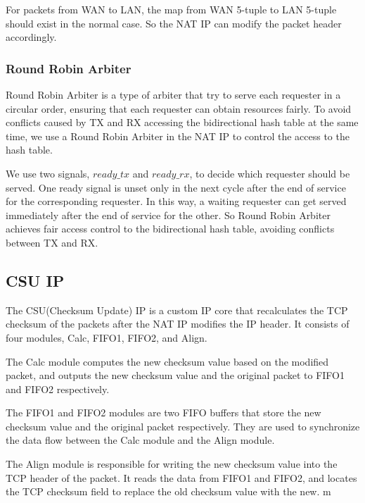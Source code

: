     For packets from WAN to LAN, the map from WAN 5-tuple to LAN 5-tuple should exist in the normal case. So the NAT IP can modify the packet header accordingly.

    \subsubsection{Round Robin Arbiter}
    Round Robin Arbiter is a type of arbiter that try to serve each requester in a circular order, ensuring that each requester can obtain resources fairly. To avoid conflicts caused by TX and RX accessing the bidirectional hash table at the same time, we use a Round Robin Arbiter in the NAT IP to control the access to the hash table. 

    We use two signals, $ready\_tx$ and $ready\_rx$, to decide which requester should be served. One ready signal  is unset only in the next cycle after the end of service for the corresponding requester. In this way, a waiting requester can get served immediately after the end of service for the other. So Round Robin Arbiter achieves fair access control to the bidirectional hash table, avoiding conflicts between TX and RX.
    
\subsection{CSU IP}
    The CSU(Checksum Update) IP is a custom IP core that recalculates the TCP checksum of the packets after the NAT IP modifies the IP header. It consists of four modules, Calc, FIFO1, FIFO2, and Align. 

    The Calc module computes the new checksum value based on the modified packet, and outputs the new checksum value and the original packet to FIFO1 and FIFO2 respectively.

    The FIFO1 and FIFO2 modules are two FIFO buffers that store the new checksum value and the original packet respectively. They are used to synchronize the data flow between the Calc module and the Align module. 

    The Align module is responsible for writing the new checksum value into the TCP header of the packet. It reads the data from FIFO1 and FIFO2, and locates the TCP checksum field to replace the old checksum value with the new.
m